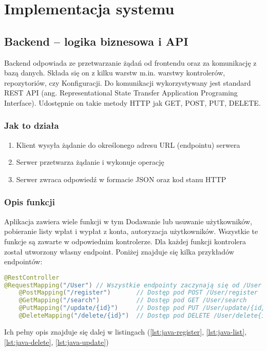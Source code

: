 \chapter{Implementacja systemu}

\section{Backend – logika biznesowa i API}
Backend odpowiada ze przetwarzanie żądań od frontendu oraz za komunikację z bazą danych. Składa się on z kilku warstw m.in. warstwy kontrolerów, repozytoriów, czy Konfiguracji. Do komunikacji wykorzystywany jest standard REST API (ang. Representational State Transfer Application Programing Interface). Udostępnie on takie metody HTTP jak GET, POST, PUT, DELETE.
\subsection*{Jak to działa}
\begin{enumerate}
	\item Klient wysyła żądanie do określonego adresu URL (endpointu) serwera
	\item Serwer przetwarza żądanie i wykonuje operację
	\item Serwer zwraca odpowiedź w formacie JSON oraz kod stanu HTTP
\end{enumerate}
\subsection*{Opis funkcji}
Aplikacja zawiera wiele funkcji w tym Dodawanie lub usuwanie użytkowników, pobieranie listy wpłat i wypłat z konta, autoryzacja użytkowników. Wszystkie te funkcje są zawarte w odpowiednim kontrolerze. Dla każdej funkcji kontrolera został utworzony własny endpoint. Poniżej znajduje się kilka przykładów endpointów:
\begin{lstlisting}[language={Java}, caption={Przykładowe Endpointy}, label={lst:java-endpoints}]
@RestController 
@RequestMapping("/User") // Wszystkie endpointy zaczynają się od /User
	@PostMapping("/register")		// Dostęp pod POST /User/register
	@GetMapping("/search")			// Dostęp pod GET /User/search
	@PutMapping("/update/{id}")		// Dostęp pod PUT /User/update/{id}
	@DeleteMapping("/delete/{id}")	// Dostęp pod DELETE /User/delete{id}
\end{lstlisting}
Ich pełny opis znajduje się dalej w listingach (\ref{lst:java-register}, \ref{lst:java-list}, \ref{lst:java-delete}, \ref{lst:java-update})
